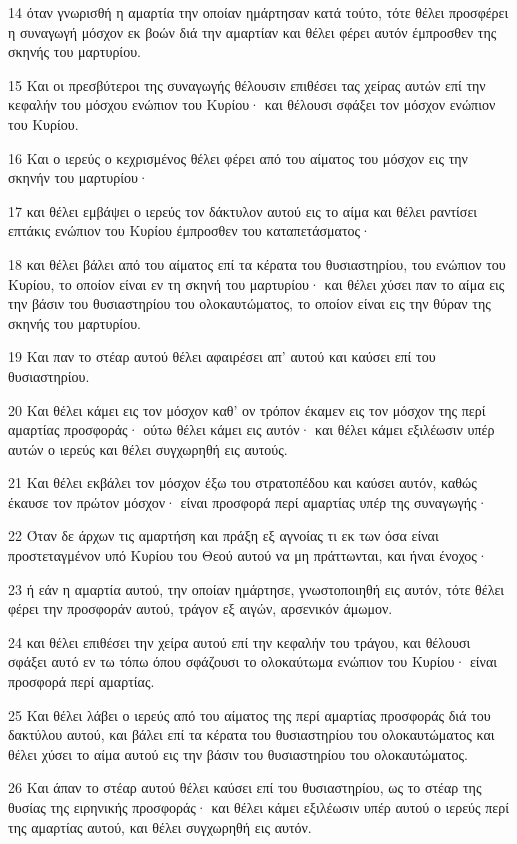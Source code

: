 \par 14 όταν γνωρισθή η αμαρτία την οποίαν ημάρτησαν κατά τούτο, τότε θέλει προσφέρει η συναγωγή μόσχον εκ βοών διά την αμαρτίαν και θέλει φέρει αυτόν έμπροσθεν της σκηνής του μαρτυρίου.
\par 15 Και οι πρεσβύτεροι της συναγωγής θέλουσιν επιθέσει τας χείρας αυτών επί την κεφαλήν του μόσχου ενώπιον του Κυρίου· και θέλουσι σφάξει τον μόσχον ενώπιον του Κυρίου.
\par 16 Και ο ιερεύς ο κεχρισμένος θέλει φέρει από του αίματος του μόσχον εις την σκηνήν του μαρτυρίου·
\par 17 και θέλει εμβάψει ο ιερεύς τον δάκτυλον αυτού εις το αίμα και θέλει ραντίσει επτάκις ενώπιον του Κυρίου έμπροσθεν του καταπετάσματος·
\par 18 και θέλει βάλει από του αίματος επί τα κέρατα του θυσιαστηρίου, του ενώπιον του Κυρίου, το οποίον είναι εν τη σκηνή του μαρτυρίου· και θέλει χύσει παν το αίμα εις την βάσιν του θυσιαστηρίου του ολοκαυτώματος, το οποίον είναι εις την θύραν της σκηνής του μαρτυρίου.
\par 19 Και παν το στέαρ αυτού θέλει αφαιρέσει απ' αυτού και καύσει επί του θυσιαστηρίου.
\par 20 Και θέλει κάμει εις τον μόσχον καθ' ον τρόπον έκαμεν εις τον μόσχον της περί αμαρτίας προσφοράς· ούτω θέλει κάμει εις αυτόν· και θέλει κάμει εξιλέωσιν υπέρ αυτών ο ιερεύς και θέλει συγχωρηθή εις αυτούς.
\par 21 Και θέλει εκβάλει τον μόσχον έξω του στρατοπέδου και καύσει αυτόν, καθώς έκαυσε τον πρώτον μόσχον· είναι προσφορά περί αμαρτίας υπέρ της συναγωγής·
\par 22 Όταν δε άρχων τις αμαρτήση και πράξη εξ αγνοίας τι εκ των όσα είναι προστεταγμένον υπό Κυρίου του Θεού αυτού να μη πράττωνται, και ήναι ένοχος·
\par 23 ή εάν η αμαρτία αυτού, την οποίαν ημάρτησε, γνωστοποιηθή εις αυτόν, τότε θέλει φέρει την προσφοράν αυτού, τράγον εξ αιγών, αρσενικόν άμωμον.
\par 24 και θέλει επιθέσει την χείρα αυτού επί την κεφαλήν του τράγου, και θέλουσι σφάξει αυτό εν τω τόπω όπου σφάζουσι το ολοκαύτωμα ενώπιον του Κυρίου· είναι προσφορά περί αμαρτίας.
\par 25 Και θέλει λάβει ο ιερεύς από του αίματος της περί αμαρτίας προσφοράς διά του δακτύλου αυτού, και βάλει επί τα κέρατα του θυσιαστηρίου του ολοκαυτώματος και θέλει χύσει το αίμα αυτού εις την βάσιν του θυσιαστηρίου του ολοκαυτώματος.
\par 26 Και άπαν το στέαρ αυτού θέλει καύσει επί του θυσιαστηρίου, ως το στέαρ της θυσίας της ειρηνικής προσφοράς· και θέλει κάμει εξιλέωσιν υπέρ αυτού ο ιερεύς περί της αμαρτίας αυτού, και θέλει συγχωρηθή εις αυτόν.
